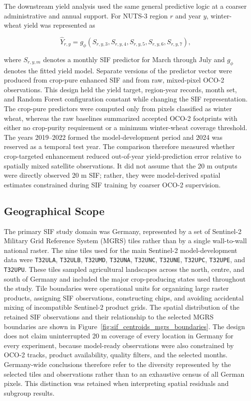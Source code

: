 The downstream yield analysis used the same general predictive logic at a coarser administrative and annual support. For NUTS-3 region $r$ and year $y$, winter-wheat yield was represented as

\begin{equation}
    \widehat{Y}_{r,y} = g_{\phi}\!\left(S_{r,y,3},S_{r,y,4},S_{r,y,5},S_{r,y,6},S_{r,y,7}\right),
    \label{eq:yield_design}
\end{equation}

where $S_{r,y,m}$ denotes a monthly SIF predictor for March through July and $g_{\phi}$ denotes the fitted yield model. Separate versions of the predictor vector were produced from crop-pure enhanced SIF and from raw, mixed-pixel OCO-2 observations. This design held the yield target, region-year records, month set, and Random Forest configuration constant while changing the SIF representation. The crop-pure predictors were computed only from pixels classified as winter wheat, whereas the raw baselines summarized accepted OCO-2 footprints with either no crop-purity requirement or a minimum winter-wheat coverage threshold. The years 2019--2022 formed the model-development period and 2024 was reserved as a temporal test year. The comparison therefore measured whether crop-targeted enhancement reduced out-of-year yield-prediction error relative to spatially mixed satellite observations. It did not assume that the 20 m outputs were directly observed 20 m SIF; rather, they were model-derived spatial estimates constrained during SIF training by coarser OCO-2 supervision.

\subsection{Geographical Scope}

The primary SIF study domain was Germany, represented by a set of Sentinel-2 Military Grid Reference System (MGRS) tiles rather than by a single wall-to-wall national raster. The nine tiles used for the main Sentinel-2 model-development data were \texttt{T32ULA}, \texttt{T32ULB}, \texttt{T32UMD}, \texttt{T32UNA}, \texttt{T32UNC}, \texttt{T32UNE}, \texttt{T32UPC}, \texttt{T32UPE}, and \texttt{T32UPU}. These tiles sampled agricultural landscapes across the north, centre, and south of Germany and included the major crop-producing states used throughout the study. Tile boundaries were operational units for organizing large raster products, assigning SIF observations, constructing chips, and avoiding accidental mixing of incompatible Sentinel-2 product grids. The spatial distribution of the retained SIF observations and their relationship to the selected MGRS boundaries are shown in Figure~\ref{fig:sif_centroids_mgrs_boundaries}. The design does not claim uninterrupted 20 m coverage of every location in Germany for every experiment, because model-ready observations were also constrained by OCO-2 tracks, product availability, quality filters, and the selected months. Germany-wide conclusions therefore refer to the diversity represented by the selected tiles and observations rather than to an exhaustive census of all German pixels. This distinction was retained when interpreting spatial residuals and subgroup results.

